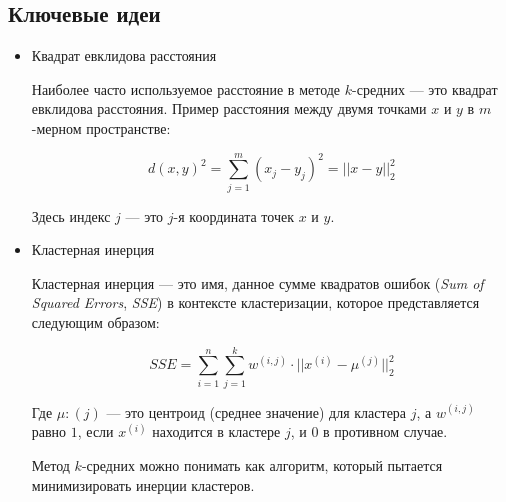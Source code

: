 \subsection{Ключевые идеи}

\begin{itemize}

\item Квадрат евклидова расстояния

Наиболее часто используемое расстояние в методе $k$-средних --- это квадрат евклидова расстояния. Пример расстояния между двумя точками $x$ и $y$ в $m$-мерном пространстве:

$$d(x, y)^2 = \sum\limits_{j=1}^m (x_j - y_j)^2 = ||x - y||^2_2$$

Здесь индекс $j$ --- это $j$-я координата точек $x$ и $y$.
\item Кластерная инерция

Кластерная инерция --- это имя, данное сумме квадратов ошибок (\textit{Sum of Squared Errors}, \textit{SSE}) в контексте кластеризации, которое представляется следующим образом:

$$SSE = \sum\limits_{i=1}^n\sum\limits_{j=1}^k w^{(i, j)} \cdot ||x^{(i)} - \mu^{(j)}||_2^2$$

Где $\mu:{(j)}$ --- это центроид (среднее значение) для кластера $j$, а $w^{(i, j)}$ равно $1$, если $x^{(i)}$ находится в кластере $j$, и $0$ в противном случае.

Метод $k$-средних можно понимать как алгоритм, который пытается минимизировать инерции кластеров.

\end{itemize}